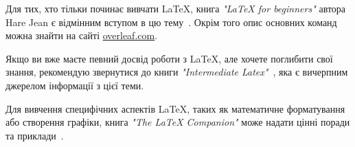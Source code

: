 	Для тих, хто тільки починає вивчати LaTeX, книга \textit{"LaTeX for beginners"} автора Hare Jean є відмінним вступом в цю тему~\cite{latexbegin}. Окрім того опис основних команд можна знайти на сайті \href{https://www.overleaf.com/learn}{overleaf.com}.
	
	Якщо ви вже маєте певний досвід роботи з LaTeX, але хочете поглибити свої знання, рекомендую звернутися до книги \textit{"Intermediate Latex"}~\cite{latexintermid}, яка є вичерпним джерелом інформації з цієї теми.\cite{ozdemir2023quick}
	
	Для вивчення специфічних аспектів LaTeX, таких як математичне форматування або створення графіки, книга \textit{"The LaTeX Companion"} може надати цінні поради та приклади~\cite{latexguide}.
	
	\newpage
	
	
	
	\newpage
	\appendix
	
